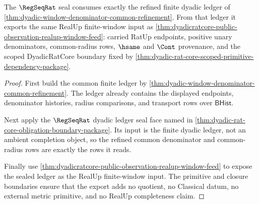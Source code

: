 \begin{theorem}
\label{thm:regseqrat-dyadic-common-radius-seal}
The $\RegSeqRat$ seal consumes exactly the refined finite dyadic ledger of
\autoref{thm:dyadic-window-denominator-common-refinement}. From that ledger it
exports the same RealUp finite-window input as
\autoref{thm:dyadicratcore-public-observation-realup-window-feed}: carried
RatUp endpoints, positive unary denominators, common-radius rows, $\hsame$ and
$\Cont$ provenance, and the scoped DyadicRatCore boundary fixed by
\autoref{thm:dyadic-rat-core-scoped-primitive-dependency-package}.
\end{theorem}
\begin{proof}
First build the common finite ledger by
\autoref{thm:dyadic-window-denominator-common-refinement}. The ledger already
contains the displayed endpoints, denominator histories, radius comparisons,
and transport rows over $\mathsf{BHist}$.

Next apply the $\RegSeqRat$ dyadic ledger seal face named in
\autoref{thm:dyadic-rat-core-obligation-boundary-package}. Its input is the
finite dyadic ledger, not an ambient completion object, so the refined common
denominator and common-radius rows are exactly the rows it reads.

Finally use \autoref{thm:dyadicratcore-public-observation-realup-window-feed}
to expose the sealed ledger as the RealUp finite-window input. The primitive
and closure boundaries ensure that the export adds no quotient, no Classical
datum, no external metric primitive, and no RealUp completeness claim.
\end{proof}


